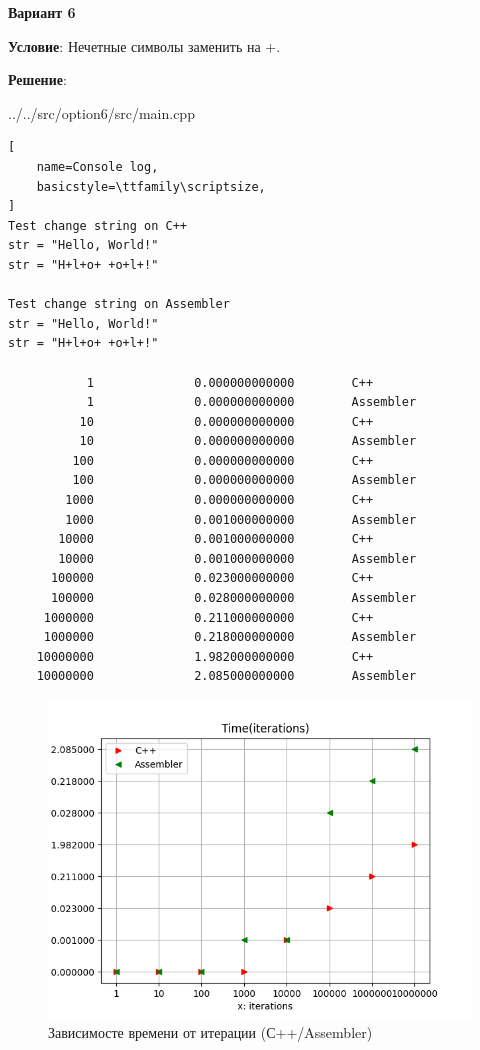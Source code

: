 \newpage

\begin{center}
    \textbf{Вариант 6}
\end{center}

\textbf{Условие}:
Нечетные символы заменить на +.

\textbf{Решение}:


{../../src/option6/src/main.cpp}

\newpage

\begin{lstlisting}[
    name=Console log,
    basicstyle=\ttfamily\scriptsize,
]
Test change string on C++
str = "Hello, World!"
str = "H+l+o+ +o+l+!"

Test change string on Assembler
str = "Hello, World!"
str = "H+l+o+ +o+l+!"

           1              0.000000000000        C++
           1              0.000000000000        Assembler
          10              0.000000000000        C++
          10              0.000000000000        Assembler
         100              0.000000000000        C++
         100              0.000000000000        Assembler
        1000              0.000000000000        C++
        1000              0.001000000000        Assembler
       10000              0.001000000000        C++
       10000              0.001000000000        Assembler
      100000              0.023000000000        C++
      100000              0.028000000000        Assembler
     1000000              0.211000000000        C++
     1000000              0.218000000000        Assembler
    10000000              1.982000000000        C++
    10000000              2.085000000000        Assembler
\end{lstlisting}

%

\begin{figure}[!htp]
    \centering
    \includegraphics[]
    {../_INCLUDES/option6.png}
    \caption{Зависимосте времени от итерации (С++/Assembler)}
\end{figure}